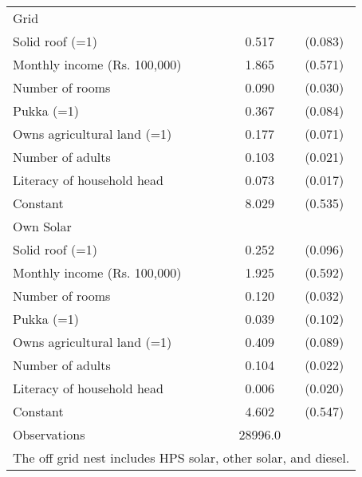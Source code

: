 \begin{table}[htbp]
\begin{tabular}{l*{1}{cc}}
\midrule
Grid               &                     &            \\
Solid roof (=1)     &       0.517\sym{***}&     (0.083)\\
Monthly income (Rs. 100,000)&       1.865\sym{***}&     (0.571)\\
Number of rooms     &       0.090\sym{***}&     (0.030)\\
Pukka (=1)          &       0.367\sym{***}&     (0.084)\\
Owns agricultural land (=1)&       0.177\sym{**} &     (0.071)\\
Number of adults    &       0.103\sym{***}&     (0.021)\\
Literacy of household head&       0.073\sym{***}&     (0.017)\\
Constant            &       8.029\sym{***}&     (0.535)\\
\midrule
Own Solar           &                     &            \\
Solid roof (=1)     &       0.252\sym{***}&     (0.096)\\
Monthly income (Rs. 100,000)&       1.925\sym{***}&     (0.592)\\
Number of rooms     &       0.120\sym{***}&     (0.032)\\
Pukka (=1)          &       0.039         &     (0.102)\\
Owns agricultural land (=1)&       0.409\sym{***}&     (0.089)\\
Number of adults    &       0.104\sym{***}&     (0.022)\\
Literacy of household head&       0.006         &     (0.020)\\
Constant            &       4.602\sym{***}&     (0.547)\\

\midrule
Observations        &     28996.0         &            \\
\bottomrule
\multicolumn{3}{l}{\footnotesize The off grid nest includes HPS solar, other solar, and diesel.}\\
\end{tabular}
\end{table}
